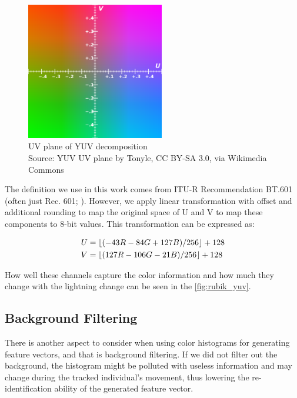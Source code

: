 \begin{figure}
    \centering
    \includegraphics[width=6cm]{img/YUV_UV_plane.svg.png}
    \caption[UV plane of YUV decomposition]{UV plane of YUV decomposition\\
    Source: YUV UV plane\protect\footnotemark{} by Tonyle, CC BY-SA 3.0, via Wikimedia Commons \protect\footnotemark{}}
    \label{fig:yuv_decomposition}
\end{figure}
\addtocounter{footnote}{-2}

The definition we use in this work comes from ITU-R Recommendation BT.601
(often just Rec. 601; \cite{bt2011studio}). However, we apply linear
transformation with offset and additional rounding to map the original space of U and V
to map these components to 8-bit values. This transformation can be expressed
as:

\begin{align*}
U &= \lfloor(-43R - 84G + 127B) / 256\rfloor + 128 \\
V &= \lfloor(127R - 106G - 21B) / 256\rfloor + 128
\end{align*}

How well these channels capture the color information and how much they change with the lightning change can be seen in the \autoref{fig:rubik_yuv}.

\subsection{Background Filtering}

There is another aspect to consider when using color histograms for generating feature vectors, and that is background filtering. If we did not filter out the background, the histogram might be polluted with useless information and may change during the tracked individual's movement, thus lowering the re-identification ability of the generated feature vector.

